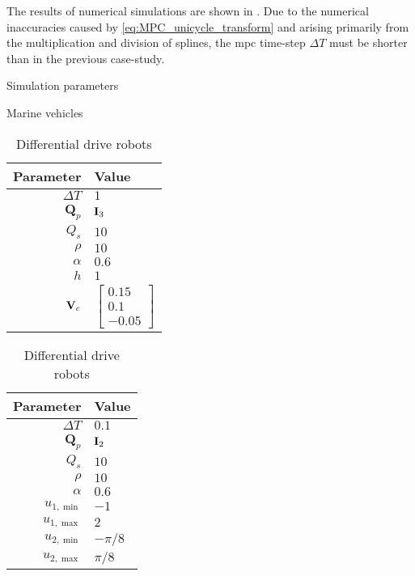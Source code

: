 The results of numerical simulations are shown in .
Due to the numerical inaccuracies caused by \eqref{eq:MPC_unicycle_transform} and arising primarily from the multiplication and division of splines, the \gls{mpc} time-step $\Delta T$ must be shorter than in the previous case-study.

\begin{table}[t]
    \begin{center}
    \captionsetup{width=.9\textwidth}
    \caption{Simulation parameters} \label{tab:handpos_MPC_params}
    \vspace*{-2mm}
    
    \begin{subtable}[t]{0.4\textwidth}
        \caption{Marine vehicles}
        \label{tab:MPC_AUV}
        
        \begin{tabular}[t]{r|l}
            {\bf Parameter} & {\bf Value} \\
            \hline
            $\Delta T$ & $1$ \\
            $\bm{Q}_p$ & $\mathbf{I}_3$ \\
            $Q_s$ & $10$ \\
            $\rho$ & $10$ \\
            $\alpha$ & $0.6$ \\
            $h$ & $1$ \\
            $\mathbf{V}_c$ & $\begin{bmatrix} 0.15 \\ 0.1 \\ -0.05 \end{bmatrix}$
        \end{tabular}
    \end{subtable}
    \begin{subtable}[t]{0.4\textwidth}
        \caption{Differential drive robots}
        \label{tab:MPC_unicycle}
        
        \begin{tabular}[t]{r|l}
            {\bf Parameter} & {\bf Value} \\
            \hline
            $\Delta T$ & $0.1$ \\
            $\bm{Q}_p$ & $\mathbf{I}_2$ \\
            $Q_s$ & $10$ \\
            $\rho$ & $10$ \\
            $\alpha$ & $0.6$ \\
            $u_{1, \min}$ & $-1$ \\
            $u_{1, \max}$ & $2$ \\
            $u_{2, \min}$ & $-\pi / 8$ \\
            $u_{2, \max}$ & $\pi / 8$
        \end{tabular}
    \end{subtable}
    \end{center}
\end{table}
